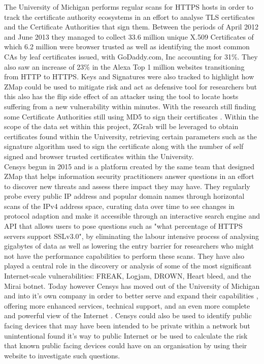 \documentclass[a4wide,leqno,12pt]{report}
\begin{document}
The University of Michigan performs regular scans for HTTPS hosts\cite{durumeric2014internet} in order to track the certificate authority ecosystems in an effort to analyse TLS certificates and the Certificate Authorities that sign them. Between the periods of April 2012 and June 2013 they managed to collect 33.6 million unique X.509 Certificates of which 6.2 million were browser trusted as well as identifying the most common CAs by leaf certificates issued, with GoDaddy.com, Inc accounting for 31\%. They also saw an increase of 23\% in the Alexa Top 1 million websites \cite{top20161} transitioning from HTTP to HTTPS. Keys and Signatures were also tracked to highlight how ZMap could be used to mitigate risk and act as defensive tool for researchers but this also has the flip side effect of an attacker using the tool to locate hosts suffering from a new vulnerability within minutes\cite{durumeric2013zmap}. With the research still finding some Certificate Authorities still using MD5 to sign their certificates \cite{durumeric2013analysis}. Within the scope of the data set within this project, ZGrab will be leveraged to obtain certificates found within the University, retrieving certain parameters such as the signature algorithm used to sign the certificate along with the number of self signed and browser trusted certificates within the University.\\


Censys begun in 2015 and is a platform created by the same team that designed ZMap that helps information security practitioners answer questions in an effort to discover new threats and assess there impact they may have. They regularly probe every public IP address and popular domain names through horizontal scans of the IPv4 address space, curating data over time to see changes in protocol adaption and make it accessible through an interactive search engine and API that allows users to pose questions such as "what percentage of HTTPS servers support SSLv3.0", by eliminating the labour intensive process of analysing gigabytes of data as well as lowering the entry barrier for researchers who might not have the performance capabilities to perform these scans\cite{durumeric2015search}. They have also played a central role in the discovery or analysis of some of the most significant Internet-scale vulnerabilities: FREAK, Logjam, DROWN, Heart bleed, and the Mirai botnet. Today however Censys has moved out of the University of Michigan and into it's own company in order to better serve and expand their capabilities , offering more enhanced services, technical support, and an even more complete and powerful view of the Internet \cite{censysWeb}.
Censys could also be used to identify public facing devices that may have been intended to be private within a network but unintentional found it's way to public Internet or be used to calculate the risk that known public facing devices could have on an organisation \cite{durumeric2015search} by using their website to investigate such questions.\\
\end{document}
